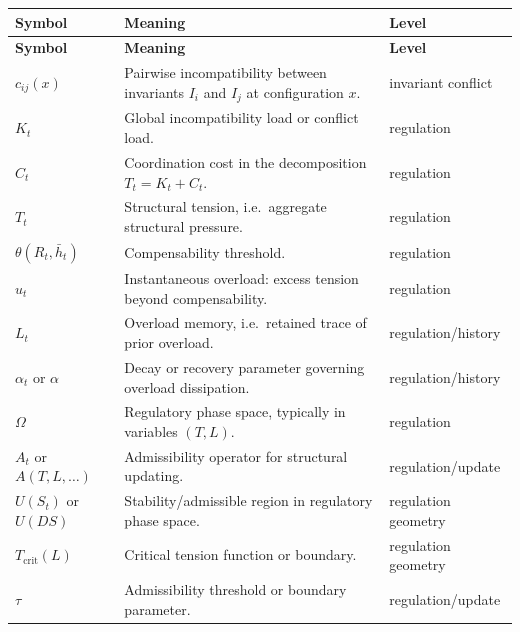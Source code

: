 \documentclass[11pt,a4paper]{article}
\begin{document}
	\begin{longtable}{>{\RaggedRight\arraybackslash}p{}
			>{\RaggedRight\arraybackslash}p{}
			>{\RaggedRight\arraybackslash}p{}}
		\toprule
		\textbf{Symbol} & \textbf{Meaning} & \textbf{Level} \\
		\midrule
		\endfirsthead
		\toprule
		\textbf{Symbol} & \textbf{Meaning} & \textbf{Level} \\
		\midrule
		\endhead
		
		$c_{ij}(x)$ & Pairwise incompatibility between invariants $I_i$ and $I_j$ at configuration $x$. & invariant conflict \\
		
		$K_t$ & Global incompatibility load or conflict load. & regulation \\
		
		$C_t$ & Coordination cost in the decomposition $T_t = K_t + C_t$. & regulation \\
		
		$T_t$ & Structural tension, i.e.\ aggregate structural pressure. & regulation \\
		
		$\theta(R_t,\bar h_t)$ & Compensability threshold. & regulation \\
		
		$u_t$ & Instantaneous overload: excess tension beyond compensability. & regulation \\
		
		$L_t$ & Overload memory, i.e.\ retained trace of prior overload. & regulation/history \\
		
		$\alpha_t$ or $\alpha$ & Decay or recovery parameter governing overload dissipation. & regulation/history \\
		
		$\Omega$ & Regulatory phase space, typically in variables $(T,L)$. & regulation \\
		
		$A_t$ or $A(T,L,\dots)$ & Admissibility operator for structural updating. & regulation/update \\
		
		$U(S_t)$ or $U(DS)$ & Stability/admissible region in regulatory phase space. & regulation geometry \\
		
		$T_{\mathrm{crit}}(L)$ & Critical tension function or boundary. & regulation geometry \\
		
		$\tau$ & Admissibility threshold or boundary parameter. & regulation/update \\
		
		\bottomrule
	\end{longtable}
	
\end{document}
